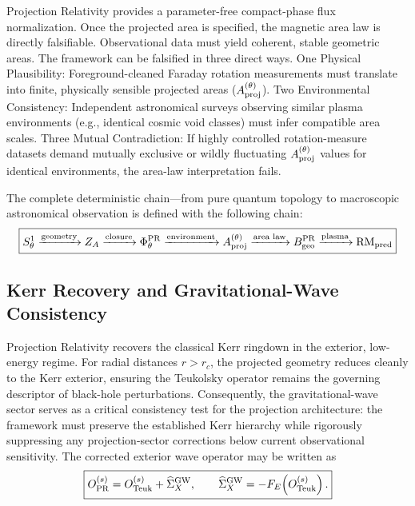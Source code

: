 \documentclass[11pt]{article}
\begin{document}
Projection Relativity provides a parameter-free compact-phase flux normalization. Once the projected area is specified, the magnetic area law is directly falsifiable. Observational data must yield coherent, stable geometric areas. The framework can be falsified in three direct ways. One Physical Plausibility: Foreground-cleaned Faraday rotation measurements must translate into finite, physically sensible projected areas ($A_{\rm proj}^{(\theta)}$). Two Environmental Consistency: Independent astronomical surveys observing similar plasma environments (e.g., identical cosmic void classes) must infer compatible area scales. Three Mutual Contradiction: If highly controlled rotation-measure datasets demand mutually exclusive or wildly fluctuating $A_{\rm proj}^{(\theta)}$ values for identical environments, the area-law interpretation fails.

The complete deterministic chain---from pure quantum topology to macroscopic astronomical observation is defined with the following chain:
\begin{equation}
\boxed{
S^1_\theta
\xrightarrow{\text{geometry}}
Z_A
\xrightarrow{\text{closure}}
\Phi_\theta^{\rm PR}
\xrightarrow{\text{environment}}
A_{\rm proj}^{(\theta)}
\xrightarrow{\text{area law}}
B_{\rm geo}^{\rm PR}
\xrightarrow{\text{plasma}}
{\rm RM}_{\rm pred}
}
\end{equation}

\subsection{Kerr Recovery and Gravitational-Wave Consistency}
\label{sec:gw_kerr_recovery}

Projection Relativity recovers the classical Kerr ringdown in the exterior, low-energy regime. For radial distances $r > r_c$, the projected geometry reduces cleanly to the Kerr exterior, ensuring the Teukolsky operator remains the governing descriptor of black-hole perturbations. Consequently, the gravitational-wave sector serves as a critical consistency test for the projection architecture: the framework must preserve the established Kerr hierarchy while rigorously suppressing any projection-sector corrections below current observational sensitivity. The corrected exterior wave operator may be written as
\begin{equation}
\boxed{
O_{\rm PR}^{(s)}
=
O_{\rm Teuk}^{(s)}
+
\widehat{\Sigma}_{X}^{\rm GW},
\qquad
\widehat{\Sigma}_{X}^{\rm GW}
=
-F_E\!\left(O_{\rm Teuk}^{(s)}\right).
}
\end{equation}
\end{document}
